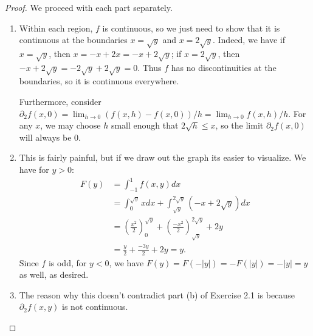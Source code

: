 \documentclass[12pt]{article}
\theoremstyle{remark}
\theoremstyle{named}
\begin{document}
\begin{proof}
    We proceed with each part separately.
    \begin{enumerate}
        \item Within each region, \(f\) is continuous, so we just need to show that it is continuous at the boundaries \(x = \sqrt y\) and \(x = 2 \sqrt y\). Indeed, we have if \(x = \sqrt y\), then \(x = -x + 2x = -x + 2 \sqrt y\); if \(x = 2 \sqrt y\), then \(-x + 2 \sqrt y = - 2 \sqrt y + 2 \sqrt y = 0\). Thus \(f\) has no discontinuities at the boundaries, so it is continuous everywhere.
        
        Furthermore, consider \(\partial_2 f(x, 0) = \lim_{h \to 0} (f(x, h) - f(x, 0)) / h = \lim_{h \to 0} f(x, h) / h\). For any \(x\), we may choose \(h\) small enough that \(2 \sqrt h \leq x\), so the limit \(\partial_2 f(x, 0)\) will always be 0.

        \item This is fairly painful, but if we draw out the graph its easier to visualize. We have for \(y > 0\):
        \begin{align*}
            F(y) &= \int_{-1}^{1} f(x, y) dx \\
            &= \int_{0}^{\sqrt{y}} x dx + \int_{\sqrt y}^{2 \sqrt y} (-x + 2\sqrt{y}) dx \\
            &= \left(\frac{x^2}{2}\right)_0^{\sqrt y} + \left(\frac{-x^2}{2}\right)_{\sqrt y}^{2 \sqrt y} + 2 y \\
            &= \frac{y}{2} + \frac{-3y}{2} + 2y = y.
        \end{align*}
        Since \(f\) is odd, for \(y < 0\), we have \(F(y) = F(-|y|) = -F(|y|) = -|y| = y\) as well, as desired.
        \item The reason why this doesn't contradict part (b) of Exercise 2.1 is because \(\partial_2 f(x, y)\) is not continuous.
    \end{enumerate}
\end{proof}
\end{document}
